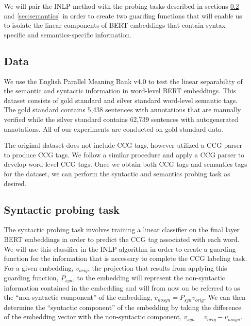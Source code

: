 \documentclass[11pt,a4paper]{article}
\begin{document}
We will pair the INLP method with the probing tasks described in sections \ref{sec:syntactic} and \ref{sec:semantics} in order to create two guarding functions that will enable us to isolate the linear components of BERT embeddings that contain syntax-specific and semantics-specific information. 


\subsection{Data}
\label{sec:data}

We use the English Parallel Meaning Bank v4.0 \citep{pmbData} to test the linear separability of the semantic and syntactic information in word-level BERT embeddings. This dataset consists of gold standard and silver standard word-level semantic tags. The gold standard contains 5,438 sentences with annotations that are manually verified while the silver standard contains 62,739 sentences with autogenerated annotations. All of our experiments are conducted on gold standard data. 

The original dataset does not include CCG tags, however \citealp{pmbData} utilized a CCG parser to produce CCG tags. We follow a similar procedure and apply a CCG parser \citep{ccg_tagger} to develop word-level CCG tags. Once we obtain both CCG tags and semantics tags for the dataset, we can perform the syntactic and semantics probing task as desired.


\subsection{Syntactic probing task}
\label{sec:syntactic}

The syntactic probing task involves training a linear classifier on the final layer BERT embeddings in order to predict the CCG tag associated with each word. We will use this classifier in the INLP algorithm in order to create a guarding function for the information that is necessary to complete the CCG labeling task. For a given embedding, $v_{orig}$, the projection that results from applying this guarding function, $P_{syn}$, to the embedding will represent the non-syntactic information contained in the embedding and will from now on be referred to as the ``non-syntactic component'' of the embedding, $v_{no syn} = P_{syn} v_{orig}$. We can then determine the ``syntactic component'' of the embedding by taking the difference of the embedding vector with the non-syntactic component, $v_{syn} = v_{orig} - v_{no syn}$.
\end{document}
